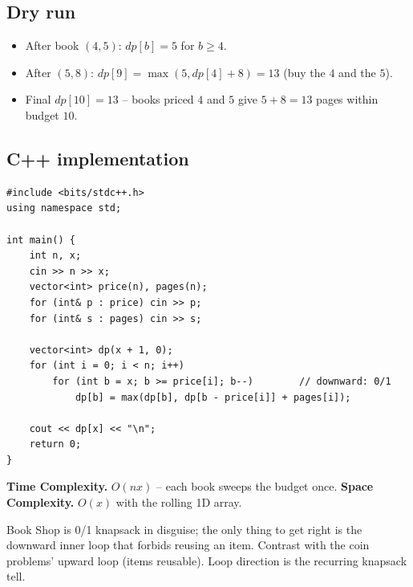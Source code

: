 \subsection*{Dry run}


\begin{itemize}
  \item After book $(4,5)$: $\textit{dp}[b]=5$ for $b\ge4$.
  \item After $(5,8)$: $\textit{dp}[9]=\max(5,\textit{dp}[4]+8)=13$
        (buy the $4$ and the $5$).
  \item Final $\textit{dp}[10]=13$ -- books priced $4$ and $5$ give
        $5+8=13$ pages within budget $10$.
\end{itemize}

\subsection*{C++ implementation}

\begin{lstlisting}
#include <bits/stdc++.h>
using namespace std;

int main() {
    int n, x;
    cin >> n >> x;
    vector<int> price(n), pages(n);
    for (int& p : price) cin >> p;
    for (int& s : pages) cin >> s;

    vector<int> dp(x + 1, 0);
    for (int i = 0; i < n; i++)
        for (int b = x; b >= price[i]; b--)        // downward: 0/1
            dp[b] = max(dp[b], dp[b - price[i]] + pages[i]);

    cout << dp[x] << "\n";
    return 0;
}
\end{lstlisting}

\begin{complexitybox}
\textbf{Time Complexity.} $O(nx)$ -- each book sweeps the budget once.
\textbf{Space Complexity.} $O(x)$ with the rolling 1D array.
\end{complexitybox}

\begin{takeawaybox}
Book Shop is 0/1 knapsack in disguise; the only thing to get right is the
downward inner loop that forbids reusing an item. Contrast with the coin
problems' upward loop (items reusable). Loop direction is the recurring
knapsack tell.
\end{takeawaybox}
